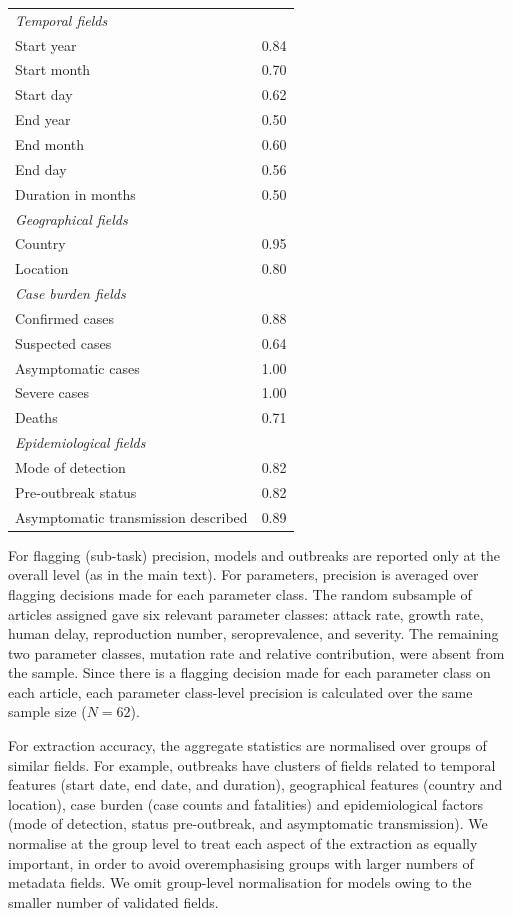 {\begin{longtable}{>{\raggedright\arraybackslash}p{10.8cm} S[table-format=1.2, round-mode=places, round-precision=2]}
\addlinespace[0.35em]
\textit{Temporal fields} & {} \\
\quad Start year & 0.84 \\
\quad Start month & 0.70 \\
\quad Start day & 0.62 \\
\quad End year & 0.50 \\
\quad End month & 0.60 \\
\quad End day & 0.56 \\
\quad Duration in months & 0.50 \\

\addlinespace[0.35em]
\textit{Geographical fields} & {} \\
\quad Country & 0.95 \\
\quad Location & 0.80 \\

\addlinespace[0.35em]
\textit{Case burden fields} & {} \\
\quad Confirmed cases & 0.88 \\
\quad Suspected cases & 0.64 \\
\quad Asymptomatic cases & 1.00 \\
\quad Severe cases & 1.00 \\
\quad Deaths & 0.71 \\

\addlinespace[0.35em]
\textit{Epidemiological fields} & {} \\
\quad Mode of detection & 0.82 \\
\quad Pre-outbreak status & 0.82 \\
\quad Asymptomatic transmission described & 0.89 \\

\end{longtable}
}

For flagging (sub-task) precision, models and outbreaks are reported only at the overall level (as in the main text). For parameters, precision is averaged over flagging decisions made for each parameter class. The random subsample of articles assigned gave six relevant parameter classes: attack rate, growth rate, human delay, reproduction number, seroprevalence, and severity. The remaining two parameter classes, mutation rate and relative contribution, were absent from the sample. Since there is a flagging decision made for each parameter class on each article, each parameter class-level precision is calculated over the same sample size ($N=62$).

For extraction accuracy, the aggregate statistics are normalised over groups of similar fields. For example, outbreaks have clusters of fields related to temporal features (start date, end date, and duration), geographical features (country and location), case burden (case counts and fatalities) and epidemiological factors (mode of detection, status pre-outbreak, and asymptomatic transmission). We normalise at the group level to treat each aspect of the extraction as equally important, in order to avoid overemphasising groups with larger numbers of metadata fields. We omit group-level normalisation for models owing to the smaller number of validated fields.


